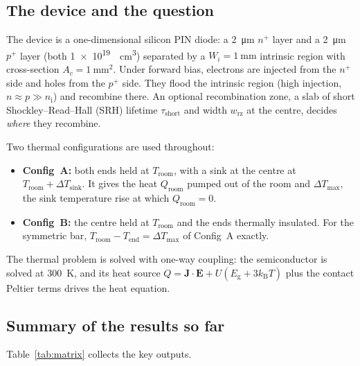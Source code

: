 \documentclass[11pt,a4paper]{article}
\newcommand{\kB}{k_{\mathrm{B}}}
\newcommand{\Eg}{E_{\mathrm{g}}}
\newcommand{\Troom}{T_{\mathrm{room}}}
\newcommand{\nI}{n_{\mathrm{i}}}
\begin{document}
\subsection{The device and the question}
The device is a one-dimensional silicon PIN diode: a \SI{2}{\micro\metre} $n^+$ layer and a \SI{2}{\micro\metre} $p^+$ layer (both \SI{1e19}{\per\centi\metre\cubed}) separated by a $W_i=\SI{1}{\milli\metre}$ intrinsic region with cross-section $A_c=\SI{1}{\milli\metre\squared}$. Under forward bias, electrons are injected from the $n^+$ side and holes from the $p^+$ side. They flood the intrinsic region (high injection, $n\approx p\gg\nI$) and recombine there. An optional recombination zone, a slab of short Shockley--Read--Hall (SRH) lifetime $\tau_{\mathrm{short}}$ and width $w_{\mathrm{rz}}$ at the centre, decides \emph{where} they recombine.

Two thermal configurations are used throughout:
\begin{itemize}
  \item \textbf{Config~A:} both ends held at $\Troom$, with a sink at the centre at $\Troom+\Delta T_{\mathrm{sink}}$. It gives the heat $Q_{\mathrm{room}}$ pumped out of the room and $\Delta T_{\max}$, the sink temperature rise at which $Q_{\mathrm{room}}=0$.
  \item \textbf{Config~B:} the centre held at $\Troom$ and the ends thermally insulated. For the symmetric bar, $\Troom-T_{\mathrm{end}}=\Delta T_{\max}$ of Config~A exactly.
\end{itemize}
The thermal problem is solved with one-way coupling: the semiconductor is solved at \SI{300}{\kelvin}, and its heat source $Q=\bm{J}\cdot\bm{E}+U(\Eg+3\kB T)$ plus the contact Peltier terms drives the heat equation.

\subsection{Summary of the results so far}
Table~\ref{tab:matrix} collects the key outputs.
\end{document}
